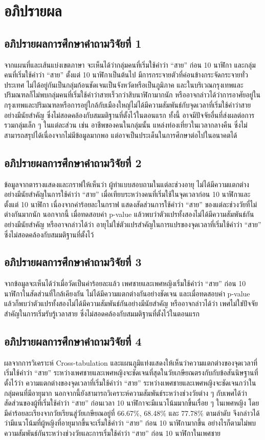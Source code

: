 \documentclass[a4paper]{article}
\begin{document}
\section{อภิปรายผล}
\subsection{อภิปรายผลการศึกษาคำถามวิจัยที่ 1}
    จากแผนที่และเส้นแบ่งเขตภาษา จะเห็นได้ว่ากลุ่มคนที่เริ่มใช้คำว่า “สาย” ก่อน 10 นาฬิกา และกลุ่มคนที่เริ่มใช้คำว่า “สาย” ตั้งแต่ 10 นาฬิกาเป็นต้นไป มีการกระจายตัวที่ค่อนข้างกระจัดกระจายทั่วประเทศ ไม่ได้อยู่กันเป็นกลุ่มก้อนชัดเจนเป็นจังหวัดหรือเป็นภูมิภาค และในบริเวณกรุงเทพและปริมณฑลก็ไม่พบกลุ่มคนที่เริ่มใช้คำว่าสายเร็วกว่าสิบนาฬิกามากนัก หรืออาจกล่าวได้ว่าการอาศัยอยู่ในกรุงเทพและปริมณฑลหรือการอยู่ใกล้กับเมืองใหญ่ไม่ได้มีความสัมพันธ์กับจุดเวลาที่เริ่มใช้คำว่าสายอย่างมีนัยสำคัญ ซึ่งไม่สอดคล้องกับสมมติฐานที่ตั้งไว้ในตอนแรก ทั้งนี้ อาจมีปัจจัยอื่นที่ส่งผลต่อการรวมกลุ่มเล็ก ๆ ในแต่ละส่วน เช่น อาชีพของคนในกลุ่มนั้น แหล่งท่องเที่ยวในเวลากลางคืน ซึ่งไม่สามารถสรุปได้เนื่องจากไม่มีข้อมูลมากพอ แต่อาจเป็นประเด็นในการศึกษาต่อไปในอนาคตได้
\subsection{อภิปรายผลการศึกษาคำถามวิจัยที่ 2}
    ข้อมูลจากตารางแสดงและกราฟให้เห็นว่า ผู้ทำแบบสอบถามในแต่ละช่วงอายุ ไม่ได้มีความแตกต่างอย่างมีนัยสำคัญในการใช้คำว่า “สาย” เมื่อเทียบระหว่างคนที่เริ่มใช้ในจุดเวลาก่อน 10 นาฬิกาและตั้งแต่ 10 นาฬิกา เนื่องจากค่าร้อยละในกราฟ แสดงสัดส่วนการใช้คำว่า “สาย”  ของแต่ละช่วงวัยที่ไม่ต่างกันมากนัก นอกจากนี้ เมื่อทดสอบค่า p-value แล้วพบว่าตัวแปรทั้งสองไม่ได้มีความสัมพันธ์กันอย่างมีนัยสำคัญ หรืออาจกล่าวได้ว่า อายุไม่ใช่ตัวแปรสำคัญในการแปรของจุดเวลาที่เริ่มใช้คำว่า “สาย” ซึ่งไม่สอดคล้องกับสมมติฐานที่ตั้งไว้
\subsection{อภิปรายผลการศึกษาคำถามวิจัยที่ 3}
    จากข้อมูลจะเห็นได้ว่าเมื่อวัดเป็นค่าร้อยละแล้ว เพศชายและเพศหญิงเริ่มใช้คำว่า “สาย” ก่อน 10 นาฬิกาในสัดส่วนที่ใกล้เคียงกัน ไม่ได้มีความแตกต่างกันอย่างชัดเจน และเมื่อทดสอบค่า p-value แล้วก็พบว่าตัวแปรทั้งสองไม่ได้มีความสัมพันธ์กันอย่างมีนัยสำคัญ หรืออาจกล่าวได้ว่า เพศไม่ใช่ปัจจัยสำคัญในการเริ่มรับรู้เวลาสาย ซึ่งไม่สอดคล้องกับสมมติฐานที่ตั้งไว้ในตอนแรก
\subsection{อภิปรายผลการศึกษาคำถามวิจัยที่ 4}
    ผลจากการวิเคราะห์ Cross-tabulation และแผนภูมิแท่งแสดงให้เห็นว่าความแตกต่างของจุดเวลาที่เริ่มใช้คำว่า “สาย” ระหว่างเพศชายและเพศหญิงจะชัดเจนที่สุดในวัยเกษียณตรงกับกับข้อสันนิษฐานที่ตั้งไว้ว่า ความแตกต่างของจุดเวลาที่เริ่มใช้คำว่า “สาย” ระหว่างเพศชายและเพศหญิงจะชัดเจนกว่าในกลุ่มคนที่มีอายุมาก นอกจากนี้ยังสามารถวิเคราะห์ความสัมพันธ์ระหว่างช่วงวัยต่าง ๆ กับเพศได้ว่าสัดส่วนของผู้ที่เริ่มใช้คำว่า “สาย” ก่อนเวลา 10 นาฬิกาจะมีแนวโน้มมากขึ้นเรื่อย ๆ ในเพศหญิง โดยมีค่าร้อยละเรียงจากวัยเรียนสู่วัยเกษียณอยู่ที่ 66.67\%, 68.48\% และ 77.78\% ตามลำดับ จึงกล่าวได้ว่ามีแนวโน้มที่ผู้หญิงที่อายุมากขึ้นจะเริ่มใช้คำว่า “สาย” ก่อน 10 นาฬิกามากขึ้น อย่างไรก็ตามไม่พบความสัมพันธ์กันระหว่างช่วงวัยและการเริ่มใช้คำว่า “สาย” ก่อน 10 นาฬิกาในเพศชาย
\end{document}
